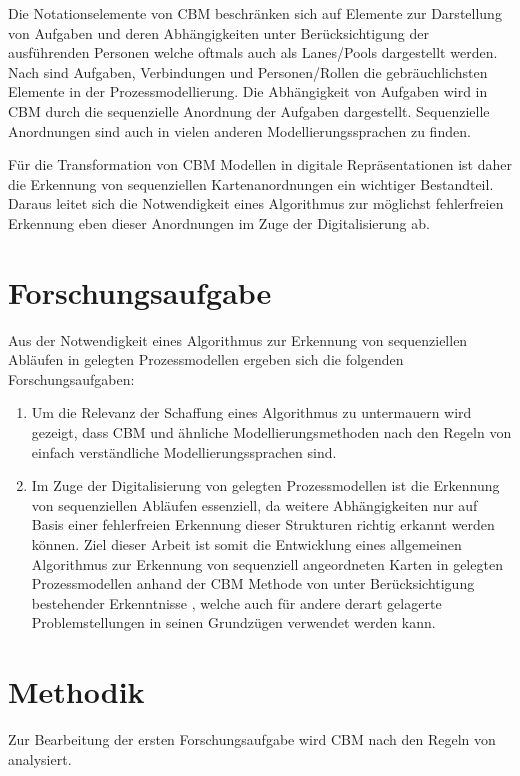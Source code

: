 Die Notationselemente von CBM beschränken sich auf Elemente zur Darstellung von Aufgaben und deren Abhängigkeiten unter Berücksichtigung der ausführenden Personen welche oftmals auch als Lanes/Pools dargestellt werden. Nach \citet{Muehlen2013} sind Aufgaben, Verbindungen und Personen/Rollen die gebräuchlichsten Elemente in der Prozessmodellierung. Die Abhängigkeit von Aufgaben wird in CBM durch die sequenzielle Anordnung der Aufgaben dargestellt. Sequenzielle Anordnungen sind auch in vielen anderen Modellierungssprachen zu finden.

Für die Transformation von CBM Modellen in digitale Repräsentationen ist daher die Erkennung von sequenziellen Kartenanordnungen ein wichtiger Bestandteil. Daraus leitet sich die Notwendigkeit eines Algorithmus zur möglichst fehlerfreien Erkennung eben dieser Anordnungen im Zuge der Digitalisierung ab.

\section{Forschungsaufgabe} %
\label{sec:forschungsaufgabe}
Aus der Notwendigkeit eines Algorithmus zur Erkennung von sequenziellen Abläufen in gelegten Prozessmodellen ergeben sich die folgenden Forschungsaufgaben:

\begin{enumerate}
	\item Um die Relevanz der Schaffung eines Algorithmus zu untermauern wird gezeigt, dass CBM und ähnliche Modellierungsmethoden nach den Regeln von \citet{MENDLING2010127} einfach verständliche Modellierungssprachen sind.
	\item Im Zuge der Digitalisierung von gelegten Prozessmodellen ist die Erkennung von sequenziellen Abläufen essenziell, da weitere Abhängigkeiten nur auf Basis einer fehlerfreien Erkennung dieser Strukturen richtig erkannt werden können. Ziel dieser Arbeit ist somit die Entwicklung eines allgemeinen Algorithmus zur Erkennung von sequenziell angeordneten Karten in gelegten Prozessmodellen anhand der CBM Methode von \citet{oppl2016linking} unter Berücksichtigung bestehender Erkenntnisse \cite{max}, welche auch für andere derart gelagerte Problemstellungen in seinen Grundzügen verwendet werden kann.
\end{enumerate}

\section{Methodik} %
\label{sec:methodik}
Zur Bearbeitung der ersten Forschungsaufgabe wird CBM nach den Regeln von \citet{MENDLING2010127} analysiert.

